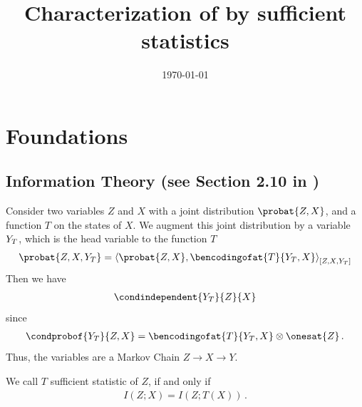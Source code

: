 \documentclass[aps,onecolumn,nofootinbib,pra]{article}
\begin{document}
    \title{Characterization of \ComputationActivationNetworks{} by sufficient statistics}

    \maketitle
    \date{\today}
    \tableofcontents


    \section{Foundations}

    \subsection{Information Theory (see Section 2.10 in \cite{cover_elements_2006})}

    Consider two variables $Z$ and $X$ with a joint distribution $\probat{Z,X}$, and a function $T$ on the states of $X$.
    We augment this joint distribution by a variable $Y_{T}$, which is the head variable to the function $T$
    \begin{align*}
        \probat{Z,X,\headvariableof{T}} = \contractionof{\probat{Z,X},\bencodingofat{T}{\headvariableof{T},X}}{Z,X,\headvariableof{T}}
    \end{align*}
    Then we have
    \begin{align*}
        \condindependent{\headvariableof{T}}{Z}{X}
    \end{align*}
    since
    \begin{align*}
        \condprobof{\headvariableof{T}}{Z,X} = \bencodingofat{T}{\headvariableof{T},X} \otimes \onesat{Z} \, .
    \end{align*}
    Thus, the variables are a Markov Chain $Z\rightarrow X\rightarrow Y$.

    \begin{definition}
        We call $T$ sufficient statistic of $Z$, if and only if
        \begin{align*}
            I(Z;X) = I(Z;T(X)) \, .
        \end{align*}
    \end{definition}
\end{document}

